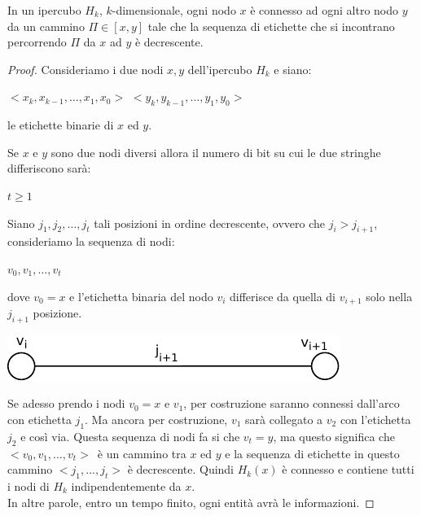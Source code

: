 \begin{prop}
    In un ipercubo $H_k$, $k$-dimensionale, ogni nodo $x$ è connesso
    ad ogni altro nodo $y$ da un cammino $\Pi \in [x,y]$ tale che la sequenza di
    etichette che si incontrano percorrendo $\Pi$ da $x$ ad $y$ è decrescente.
\end{prop}
\begin{proof}
    Consideriamo i due nodi $x,y$ dell'ipercubo $H_k$ e siano:
    \begin{center}
        $<x_k, x_{k-1}, \ldots, x_1,x_0>$ $<y_k, y_{k-1}, \ldots, y_1,y_0>$
    \end{center}
    le etichette binarie di $x$ ed $y$.

    Se $x$ e $y$ sono due nodi diversi allora il numero di bit su cui le due
    stringhe differiscono sarà:
    \begin{center}
        $t \geq 1$
    \end{center}

    Siano $j_1, j_2, \ldots, j_t$ tali posizioni in ordine decrescente, ovvero
    che $j_i > j_{i+1}$, consideriamo la sequenza di nodi:
    \begin{center}
        $v_0, v_1, \ldots ,v_t$
    \end{center}
    dove $v_0 = x$ e l'etichetta binaria del nodo $v_i$ differisce da quella di
    $v_{i+1}$ solo nella $j_{i+1}$ posizione.
    \begin{center}
        \includegraphics[scale=1]{capitoli/broadcast/imgs/n_12}
    \end{center}

    Se adesso prendo i nodi $v_0 = x $ e $v_1$, per costruzione saranno connessi
    dall'arco con etichetta $j_1$. Ma ancora per costruzione, $v_1$ sarà
    collegato a $v_2$ con l'etichetta $j_2$ e così via. Questa sequenza di nodi
    fa si che $v_t =  y$, ma questo significa che $<v_0, v_1, \ldots ,v_t>$\ è
    un cammino tra $x$ ed $y$ e la sequenza di etichette in questo cammino $<j_1,
        ..., j_t>$ è decrescente. Quindi $H_k(x)$ è connesso e contiene tutti i nodi
    di $H_k$ indipendentemente da $x$.\\
    In altre parole, entro un tempo finito, ogni entità avrà le informazioni.

\end{proof}

